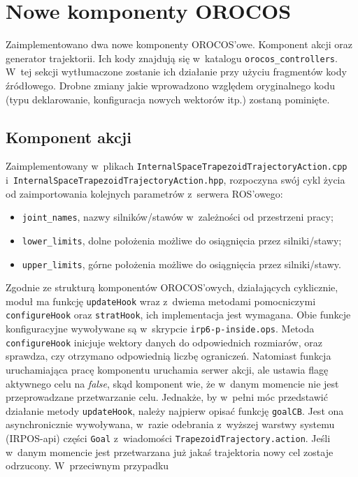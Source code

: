 \documentclass[a4paper, 12pt]{article}
\begin{document}
	\section{Nowe komponenty OROCOS}
	Zaimplementowano dwa nowe komponenty OROCOS'owe. Komponent akcji oraz generator trajektorii. Ich kody znajdują się w~katalogu \texttt{orocos\_controllers}. W~tej sekcji wytłumaczone zostanie ich działanie przy użyciu fragmentów kody źródłowego. Drobne zmiany jakie wprowadzono względem oryginalnego kodu (typu deklarowanie, konfiguracja nowych wektorów itp.) zostaną pominięte.
	
	\subsection{Komponent akcji}
	Zaimplementowany w~plikach \texttt{InternalSpaceTrapezoidTrajectoryAction.cpp} \linebreak i~\texttt{InternalSpaceTrapezoidTrajectoryAction.hpp}, rozpoczyna swój cykl życia od zaimportowania kolejnych parametrów z~serwera ROS'owego:
	\begin{itemize}
	\item \texttt{joint\_names}, nazwy silników/stawów w~zależności od przestrzeni pracy;
	\item \texttt{lower\_limits}, dolne położenia możliwe do osiągnięcia przez silniki/stawy;
	\item \texttt{upper\_limits}, górne położenia możliwe do osiągnięcia przez silniki/stawy.
	\end{itemize}
	Zgodnie ze strukturą komponentów OROCOS'owych, działających cyklicznie, moduł ma funkcję \texttt{updateHook} wraz z~dwiema metodami pomocniczymi \texttt{configureHook} oraz \texttt{stratHook}, ich implementacja jest wymagana\cite{orocosbuild}. Obie funkcje konfiguracyjne wywoływane są w~skrypcie \texttt{irp6-p-inside.ops}. Metoda \texttt{configureHook} inicjuje wektory danych do odpowiednich rozmiarów, oraz sprawdza, czy otrzymano odpowiednią liczbę ograniczeń. Natomiast funkcja uruchamiająca pracę komponentu uruchamia serwer akcji, ale ustawia flagę aktywnego celu na \textit{false}, skąd komponent wie, że w~danym momencie nie jest przeprowadzane przetwarzanie celu. Jednakże, by w~pełni móc przedstawić działanie metody \texttt{updateHook}, należy najpierw opisać funkcję \texttt{goalCB}. Jest ona asynchronicznie wywoływana, w~razie odebrania z~wyższej warstwy systemu (IRPOS-api) części \texttt{Goal} z~wiadomości \texttt{TrapezoidTrajectory.action}. Jeśli w~danym momencie jest przetwarzana już jakaś trajektoria nowy cel zostaje odrzucony. W~przeciwnym przypadku 
\end{document}
